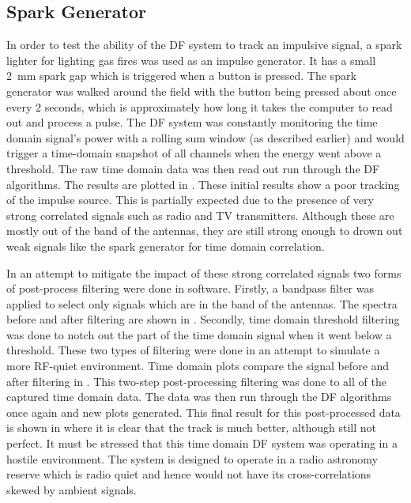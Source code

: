 \subsection{Spark Generator}
In order to test the ability of the DF system to track an impulsive signal, a spark lighter for lighting gas fires was used as an impulse generator. It has a small \SI{2}{\milli\meter} spark gap which is triggered when a button is pressed. The spark generator was walked around the field with the button being pressed about once every 2 seconds, which is approximately how long it takes the computer to read out and process a pulse. The DF system was constantly monitoring the time domain signal's power with a rolling sum window (as described earlier) and would trigger a time-domain snapshot of all channels when the energy went above a threshold. The raw time domain data was then read out run through the DF algorithms. The results are plotted in . These initial results show a poor tracking of the impulse source. This is partially expected due to the presence of very strong correlated signals such as radio and TV transmitters. Although these are mostly out of the band of the antennas, they are still strong enough to drown out weak signals like the spark generator for time domain correlation. 

In an attempt to mitigate the impact of these strong correlated signals two forms of post-process filtering were done in software. Firstly, a bandpass filter was applied to select only signals which are in the band of the antennas. The spectra before and after filtering are shown in . Secondly, time domain threshold filtering was done to notch out the part of the time domain signal when it went below a threshold. These two types of filtering were done  in an attempt to simulate a more RF-quiet environment. Time domain plots compare the signal before and after filtering in . This two-step post-processing filtering was done to all of the captured time domain data. The data was then run through the DF algorithms once again and new plots generated. This final result for this post-processed data is shown in  where it is clear that the track is much better, although still not perfect. It must be stressed that this time domain DF system was operating in a hostile environment. The system is designed to operate in a radio astronomy reserve which is radio quiet and hence would not have its cross-correlations skewed by ambient signals.

